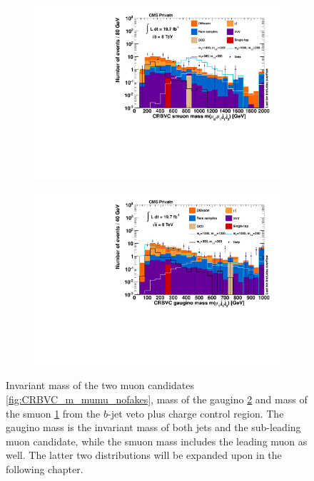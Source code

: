 \begin{figure}[htb!]
  \begin{subfigure}[b]{0.495\textwidth}
    \centering
    \includegraphics[width=\textwidth]{plots/CR6_m_smuon_nofakes.pdf}
    \caption{\label{fig:CRBVC_m_smuon_nofakes}}
  \end{subfigure}
  \begin{subfigure}[b]{0.495\textwidth}
    \centering
    \includegraphics[width=\textwidth]{plots/CR6_m_gaugino_nofakes.pdf}
    \caption{\label{fig:CRBVC_m_gaugino_nofakes}}
  \end{subfigure}

  \caption{Invariant mass of the two muon candidates \ref{fig:CRBVC_m_mumu_nofakes}, mass of the gaugino \ref{fig:CRBVC_m_gaugino_nofakes} and mass of the smuon \ref{fig:CRBVC_m_smuon_nofakes} from the $b$-jet veto plus charge control region. The gaugino mass is the invariant mass of both jets and the sub-leading muon candidate, while the smuon mass includes the leading muon as well. The latter two distributions will be expanded upon in the following chapter.}
  \label{fig:ssccr_nofakes}
\end{figure}

